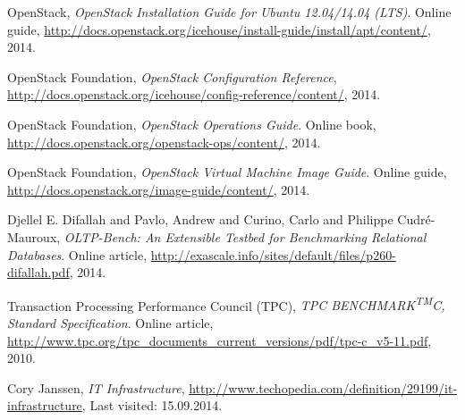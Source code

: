 \begin{thebibliography}{9}

	OpenStack, \emph{OpenStack Installation Guide for Ubuntu 12.04/14.04 (LTS)}. 
	Online guide, 
	\url{http://docs.openstack.org/icehouse/install-guide/install/apt/content/}, 
	2014.

	OpenStack Foundation, \emph{OpenStack Configuration Reference}, 
	\url{http://docs.openstack.org/icehouse/config-reference/content/}, 
	2014.

	OpenStack Foundation, \emph{OpenStack Operations Guide}. 
	Online book,
	\url{http://docs.openstack.org/openstack-ops/content/}, 
	2014.

	OpenStack Foundation, \emph{OpenStack Virtual Machine Image Guide}. 
	Online guide,
	\url{http://docs.openstack.org/image-guide/content/}, 
	2014.

  Djellel E. Difallah and Pavlo, Andrew and Curino, Carlo and Philippe Cudr{\'e}-Mauroux,
  \emph{OLTP-Bench: An Extensible Testbed for Benchmarking Relational Databases}.
  Online article, \url{http://exascale.info/sites/default/files/p260-difallah.pdf}, 
  2014.

  Transaction Processing Performance Council (TPC),
  \emph{TPC BENCHMARK\textsuperscript{TM}C, Standard Specification}.
  Online article, \url{http://www.tpc.org/tpc_documents_current_versions/pdf/tpc-c_v5-11.pdf}, 
  2010.


	Cory Janssen,
	\emph{IT Infrastructure}, 
	\url{http://www.techopedia.com/definition/29199/it-infrastructure}, 
	Last visited: 15.09.2014.







\end{thebibliography}